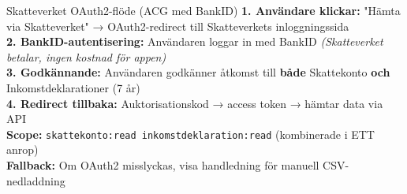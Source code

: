 \documentclass[10pt]{beamer}
\begin{document}
\begin{frame}[label=bokforing_bank]
  \vspace{0.3cm}
  \begin{block}{Skatteverket OAuth2-flöde (ACG med BankID)}
    \footnotesize
    \textbf{1. Användare klickar:} "Hämta via Skatteverket" → OAuth2-redirect till Skatteverkets inloggningssida\\
    \textbf{2. BankID-autentisering:} Användaren loggar in med BankID \textit{(Skatteverket betalar, ingen kostnad för appen)}\\
    \textbf{3. Godkännande:} Användaren godkänner åtkomst till \textbf{både} Skattekonto \textbf{och} Inkomstdeklarationer (7 år)\\
    \textbf{4. Redirect tillbaka:} Auktorisationskod → access token → hämtar data via API\\
    \textbf{Scope:} \texttt{skattekonto:read inkomstdeklaration:read} (kombinerade i ETT anrop)\\
    \textbf{Fallback:} Om OAuth2 misslyckas, visa handledning för manuell CSV-nedladdning
  \end{block}
  
  \vspace{0.3cm}
  \begin{flushright}
    \hyperlink{bokforingsunderlag}{}
  \end{flushright}
\end{frame}
\end{document}
